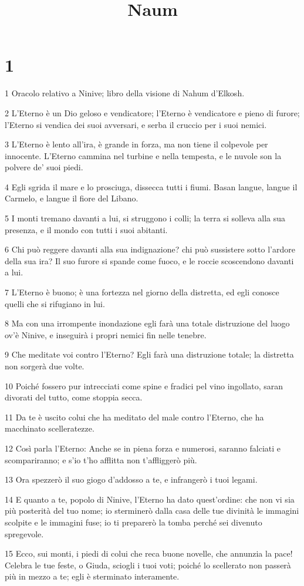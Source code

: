 

\title{Naum}


\chapter{1}

\par 1 Oracolo relativo a Ninive; libro della visione di Nahum d'Elkosh.
\par 2 L'Eterno è un Dio geloso e vendicatore; l'Eterno è vendicatore e pieno di furore; l'Eterno si vendica dei suoi avversari, e serba il cruccio per i suoi nemici.
\par 3 L'Eterno è lento all'ira, è grande in forza, ma non tiene il colpevole per innocente. L'Eterno cammina nel turbine e nella tempesta, e le nuvole son la polvere de' suoi piedi.
\par 4 Egli sgrida il mare e lo prosciuga, dissecca tutti i fiumi. Basan langue, langue il Carmelo, e langue il fiore del Libano.
\par 5 I monti tremano davanti a lui, si struggono i colli; la terra si solleva alla sua presenza, e il mondo con tutti i suoi abitanti.
\par 6 Chi può reggere davanti alla sua indignazione? chi può sussistere sotto l'ardore della sua ira? Il suo furore si spande come fuoco, e le roccie scoscendono davanti a lui.
\par 7 L'Eterno è buono; è una fortezza nel giorno della distretta, ed egli conosce quelli che si rifugiano in lui.
\par 8 Ma con una irrompente inondazione egli farà una totale distruzione del luogo ov'è Ninive, e inseguirà i propri nemici fin nelle tenebre.
\par 9 Che meditate voi contro l'Eterno? Egli farà una distruzione totale; la distretta non sorgerà due volte.
\par 10 Poiché fossero pur intrecciati come spine e fradici pel vino ingollato, saran divorati del tutto, come stoppia secca.
\par 11 Da te è uscito colui che ha meditato del male contro l'Eterno, che ha macchinato scelleratezze.
\par 12 Così parla l'Eterno: Anche se in piena forza e numerosi, saranno falciati e scompariranno; e s'io t'ho afflitta non t'affliggerò più.
\par 13 Ora spezzerò il suo giogo d'addosso a te, e infrangerò i tuoi legami.
\par 14 E quanto a te, popolo di Ninive, l'Eterno ha dato quest'ordine: che non vi sia più posterità del tuo nome; io sterminerò dalla casa delle tue divinità le immagini scolpite e le immagini fuse; io ti preparerò la tomba perché sei divenuto spregevole.
\par 15 Ecco, sui monti, i piedi di colui che reca buone novelle, che annunzia la pace! Celebra le tue feste, o Giuda, sciogli i tuoi voti; poiché lo scellerato non passerà più in mezzo a te; egli è sterminato interamente.

